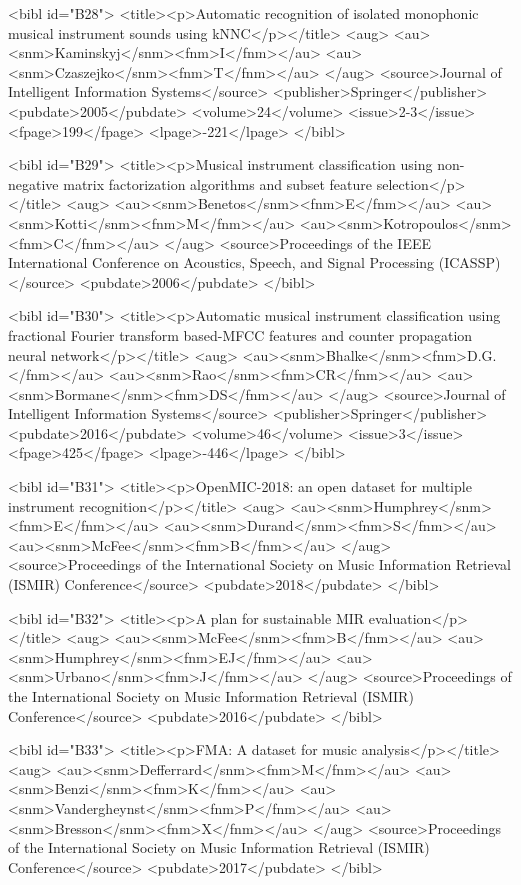 \documentclass{bmcart}
\begin{document}
\begin{backmatter}
{<bibl id="B28">
  <title><p>{Automatic recognition of isolated monophonic musical instrument
  sounds using kNNC}</p></title>
  <aug>
    <au><snm>Kaminskyj</snm><fnm>I</fnm></au>
    <au><snm>Czaszejko</snm><fnm>T</fnm></au>
  </aug>
  <source>Journal of Intelligent Information Systems</source>
  <publisher>Springer</publisher>
  <pubdate>2005</pubdate>
  <volume>24</volume>
  <issue>2-3</issue>
  <fpage>199</fpage>
  <lpage>-221</lpage>
</bibl>

<bibl id="B29">
  <title><p>Musical instrument classification using non-negative matrix
  factorization algorithms and subset feature selection</p></title>
  <aug>
    <au><snm>Benetos</snm><fnm>E</fnm></au>
    <au><snm>Kotti</snm><fnm>M</fnm></au>
    <au><snm>Kotropoulos</snm><fnm>C</fnm></au>
  </aug>
  <source>Proceedings of the IEEE International Conference on Acoustics,
  Speech, and Signal Processing (ICASSP)</source>
  <pubdate>2006</pubdate>
</bibl>

<bibl id="B30">
  <title><p>{Automatic musical instrument classification using fractional
  Fourier transform based-MFCC features and counter propagation neural
  network}</p></title>
  <aug>
    <au><snm>Bhalke</snm><fnm>D.G.</fnm></au>
    <au><snm>Rao</snm><fnm>CR</fnm></au>
    <au><snm>Bormane</snm><fnm>DS</fnm></au>
  </aug>
  <source>Journal of Intelligent Information Systems</source>
  <publisher>Springer</publisher>
  <pubdate>2016</pubdate>
  <volume>46</volume>
  <issue>3</issue>
  <fpage>425</fpage>
  <lpage>-446</lpage>
</bibl>

<bibl id="B31">
  <title><p>OpenMIC-2018: an open dataset for multiple instrument
  recognition</p></title>
  <aug>
    <au><snm>Humphrey</snm><fnm>E</fnm></au>
    <au><snm>Durand</snm><fnm>S</fnm></au>
    <au><snm>McFee</snm><fnm>B</fnm></au>
  </aug>
  <source>Proceedings of the International Society on Music Information
  Retrieval (ISMIR) Conference</source>
  <pubdate>2018</pubdate>
</bibl>

<bibl id="B32">
  <title><p>{A plan for sustainable {MIR} evaluation}</p></title>
  <aug>
    <au><snm>McFee</snm><fnm>B</fnm></au>
    <au><snm>Humphrey</snm><fnm>EJ</fnm></au>
    <au><snm>Urbano</snm><fnm>J</fnm></au>
  </aug>
  <source>Proceedings of the International Society on Music Information
  Retrieval (ISMIR) Conference</source>
  <pubdate>2016</pubdate>
</bibl>

<bibl id="B33">
  <title><p>{FMA: A dataset for music analysis}</p></title>
  <aug>
    <au><snm>Defferrard</snm><fnm>M</fnm></au>
    <au><snm>Benzi</snm><fnm>K</fnm></au>
    <au><snm>Vandergheynst</snm><fnm>P</fnm></au>
    <au><snm>Bresson</snm><fnm>X</fnm></au>
  </aug>
  <source>Proceedings of the International Society on Music Information
  Retrieval (ISMIR) Conference</source>
  <pubdate>2017</pubdate>
</bibl>

}
\end{backmatter}
\end{document}
